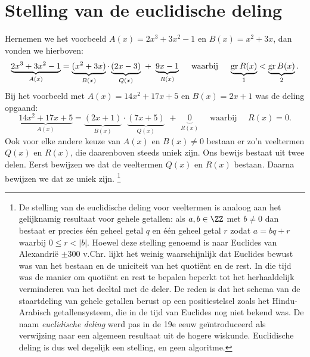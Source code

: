 \documentclass{ximera}
\begin{document}
\section{Stelling van de euclidische deling}

Hernemen we het voorbeeld $A(x) = 2x^3+3x^2-1$ en $B(x) = x^2+3x$, dan vonden we hierboven:
\[
\underbrace{2x^3+3x^2-1}_{A(x)} = \underbrace{(x^2+3x)}_{B(x)}\cdot\underbrace{(2x-3)}_{Q(x)} \,\, + \,\, \underbrace{9x-1}_{R(x)} \quad \text{ waarbij } \quad \underbrace{\operatorname{gr} R(x)}_{1} < \underbrace{\operatorname{gr} B(x)}_{2}.
\]
Bij het voorbeeld met $A(x) = 14x^2+17x+5$ en $B(x) = 2x+1$ was de deling opgaand:
\[
\underbrace{14x^2+17x+5}_{A(x)} = \underbrace{(2x+1)}_{B(x)}\cdot\underbrace{(7x+5)}_{Q(x)} \,\, + \,\, \underbrace{0}_{R(x)} \quad \text{ waarbij } \quad R(x) = 0.
\]
Ook voor elke andere keuze van $A(x)$ en $B(x) \neq 0$ bestaan er zo'n veeltermen $Q(x)$ en $R(x)$, die daarenboven steeds uniek zijn. Ons bewijs bestaat uit twee delen. Eerst bewijzen we dat de veeltermen $Q(x)$ en $R(x)$ bestaan. Daarna bewijzen we dat ze uniek zijn. \footnote{De stelling van de euclidische deling voor veeltermen is analoog aan het gelijknamig resultaat voor gehele getallen: als $a,b \in \ZZ$ met $b \neq 0$ dan bestaat er precies \'e\'en geheel getal $q$ en \'e\'en geheel getal $r$ zodat $a = bq + r$ waarbij $0 \leq r < \left|b\right|$. Hoewel deze stelling genoemd is naar Euclides van Alexandri\"e $\pm$300 v.Chr. lijkt het weinig waarschijnlijk dat Euclides bewust was van het bestaan en de uniciteit van het quoti\"ent en de rest. In die tijd was de manier om quoti\"ent en rest te bepalen beperkt tot het herhaaldelijk verminderen van het deeltal met de deler. De reden is dat het schema van de staartdeling van gehele getallen berust op een positiestelsel zoals het Hindu-Arabisch getallensysteem, die in de tijd van Euclides nog niet bekend was. De naam {\em euclidische deling} werd pas in de 19e eeuw ge\"introduceerd als verwijzing naar een algemeen resultaat uit de hogere wiskunde. Euclidische deling is dus wel degelijk een stelling, en geen algoritme.}
\end{document}
